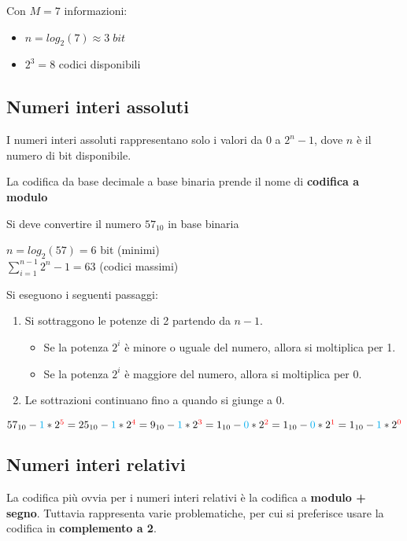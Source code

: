 \documentclass[a4paper]{article}
\theoremstyle{break}
\theoremstyle{break}
\theoremstyle{break}
\theoremstyle{break}
\theoremstyle{break}
\begin{document}
\begin{example}
	Con \( M=7 \) informazioni:
	\begin{itemize}
		\item \( n=log_2{(7)} \approx 3\; bit \)
		\item \( 2^3=8 \) codici disponibili
	\end{itemize}
\end{example}

\subsection{Numeri interi assoluti}
I numeri interi assoluti rappresentano solo i valori da \( 0 \) a \( 2^n-1 \),
dove \( n \) è il numero di bit disponibile.

La codifica da base decimale a base binaria prende il nome di \textbf{codifica
	a modulo}

\begin{example}
	\label{ex:57modulo}
	Si deve convertire il numero \( 57_{10} \) in base binaria
	\begin{center}
		\( n=log_2{(57)} = 6 \) bit (minimi)\\
		\( \sum_{i=1}^{n-1} 2^n-1 = 63 \) (codici massimi)
	\end{center}
	Si eseguono i seguenti passaggi:
	\begin{enumerate}
		\item Si sottraggono le potenze di 2 partendo da \( n-1 \).
		      \begin{itemize}
			      \item Se la potenza \( 2^i \) è minore o uguale del numero,
			            allora si moltiplica per 1.
			      \item Se la potenza \( 2^i \) è maggiore del numero,
			            allora si moltiplica per 0.
		      \end{itemize}
		\item Le sottrazioni continuano fino a quando si giunge a 0.
	\end{enumerate}
	\(57_{10}-{\textcolor{cyan}{1}}*2^{\textcolor{red}{5}}
		=25_{10}-{\textcolor{cyan}{1}}*2^{\textcolor{red}{4}}
		=9_{10}-{\textcolor{cyan}{1}}*2^{\textcolor{red}{3}}
		=1_{10}-{\textcolor{cyan}{0}}*2^{\textcolor{red}{2}}
		=1_{10}-{\textcolor{cyan}{0}}*2^{\textcolor{red}{1}}
		=1_{10}-{\textcolor{cyan}{1}}*2^{\textcolor{red}{0}}\)
\end{example}

\subsection{Numeri interi relativi}
La codifica più ovvia per i numeri interi relativi è la codifica a
\textbf{modulo + segno}. Tuttavia rappresenta varie problematiche, per cui
si preferisce usare la codifica in \textbf{complemento a 2}.
\end{document}
